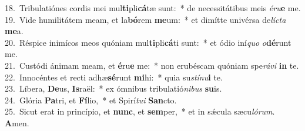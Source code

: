 {18.~}Tribulatiónes cordis mei mul\textbf{ti}pli\textbf{cá}tæ sunt:~* de necessitátibus meis \textit{é}\textit{ru}\textbf{e} me.\\
{19.~}Vide humilitátem meam, et la\textbf{bó}rem \textbf{me}um:~* et dimítte univérsa de\textit{lí}\textit{cta} \textbf{me}a.\\
{20.~}Réspice inimícos meos quóniam mul\textbf{ti}pli\textbf{cá}ti sunt:~* et ódio iní\textit{quo} \textit{o}\textbf{dé}runt me.\\
{21.~}Custódi ánimam meam, et \textbf{é}ru\textbf{e} me:~* non erubéscam quóniam spe\textit{rá}\textit{vi} \textbf{in} te.\\
{22.~}Innocéntes et recti adhæ\textbf{sé}runt \textbf{mi}hi:~* quia su\textit{stí}\textit{nu}\textbf{i} te.\\
{23.~}Líbera, \textbf{De}us, \textbf{Is}raël:~* ex ómnibus tribulatió\textit{ni}\textit{bus} \textbf{su}is.\\
{24.~}Glória \textbf{Pa}tri, et \textbf{Fí}lio,~* et Spirí\textit{tu}\textit{i} \textbf{San}cto.\\
{25.~}Sicut erat in princípio, et \textbf{nunc}, et \textbf{sem}per,~* et in sǽcula sæcu\textit{ló}\textit{rum}. \textbf{A}men.\\
